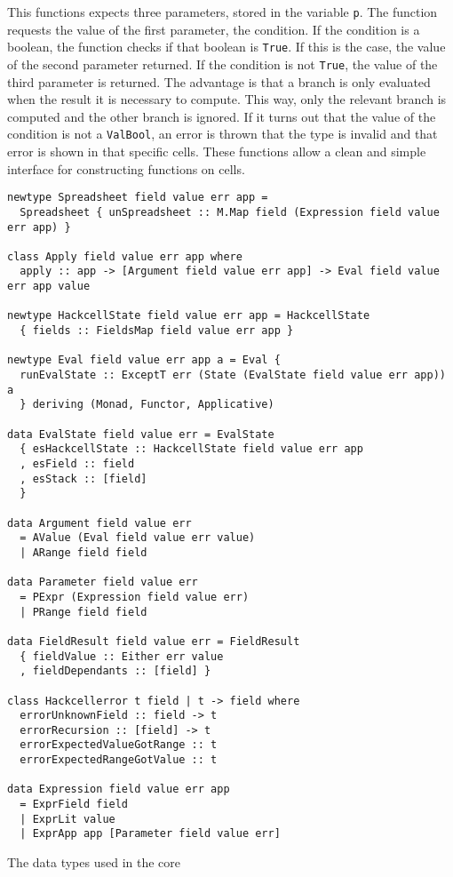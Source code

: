 \documentclass{article}
\begin{document}
This functions expects three parameters, stored in the variable \texttt{p}. The function requests the value of the first parameter, the condition. If the condition is a boolean, the function checks if that boolean is \texttt{True}. If this is the case, the value of the second parameter returned. If the condition is not \texttt{True}, the value of the third parameter is returned. The advantage is that a branch is only evaluated when the result it is necessary to compute. This way, only the relevant branch is computed and the other branch is ignored. If it turns out that the value of the condition is not a \texttt{ValBool}, an error is thrown that the type is invalid and that error is shown in that specific cells. These functions allow a clean and simple interface for constructing functions on cells. 
	\begin{listing}
		\begin{verbatim}
newtype Spreadsheet field value err app =
  Spreadsheet { unSpreadsheet :: M.Map field (Expression field value err app) }

class Apply field value err app where
  apply :: app -> [Argument field value err app] -> Eval field value err app value

newtype HackcellState field value err app = HackcellState
  { fields :: FieldsMap field value err app }

newtype Eval field value err app a = Eval {
  runEvalState :: ExceptT err (State (EvalState field value err app)) a
  } deriving (Monad, Functor, Applicative)

data EvalState field value err = EvalState
  { esHackcellState :: HackcellState field value err app
  , esField :: field
  , esStack :: [field]
  }

data Argument field value err
  = AValue (Eval field value err value)
  | ARange field field

data Parameter field value err
  = PExpr (Expression field value err)
  | PRange field field

data FieldResult field value err = FieldResult
  { fieldValue :: Either err value
  , fieldDependants :: [field] }

class Hackcellerror t field | t -> field where
  errorUnknownField :: field -> t
  errorRecursion :: [field] -> t
  errorExpectedValueGotRange :: t
  errorExpectedRangeGotValue :: t

data Expression field value err app
  = ExprField field
  | ExprLit value
  | ExprApp app [Parameter field value err]
		\end{verbatim}
		\caption{The data types used in the core}
		\label{listing:datatypes}
	\end{listing}
	
\end{document}
